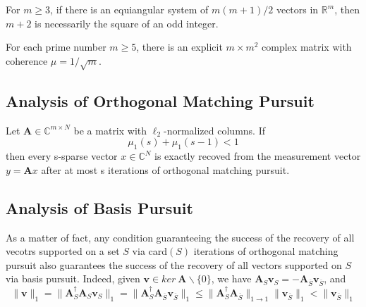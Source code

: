 \begin{theorem}
    \label{1.12}
    For $m \geq 3$, if there is an equiangular system of $m(m+1)/2$ vectors in $\mathbb{R}^m$, then $m+2$ is necessarily the square of an odd integer.
\end{theorem}

\begin{proposition}
    \label{pr1.13}
    For each prime number $m \geq 5$, there is an explicit $m \times m^2$ complex matrix with coherence $\mu = 1/\sqrt{m}$.
\end{proposition}

\subsection{Analysis of Orthogonal Matching Pursuit}
\begin{theorem}
    \label{th1.14}
    Let $\mathbf{A} \in \mathbb{C}^{m \times N}$ be a matrix with $\ell_2$-normalized columns. If 
    \begin{equation}
        \mu_1(s) + \mu_1(s-1) < 1
        \label{eq1.11}
    \end{equation}
    then every s-sparse vector $x \in \mathbb{C}^N$ is exactly recoved from the measurement vector $y = \mathbf{A}x$ after at most s iterations of orthogonal matching pursuit.
\end{theorem}

\subsection{Analysis of Basis Pursuit}
As a matter of fact, any condition guaranteeing the success of the recovery of all vecotrs supported on a set $S$ via card$(S)$ iterations of orthogonal matching pursuit also guarantees the success of the recovery of all vectors supported on $S$ via basis pursuit. Indeed, given $\mathbf{v} \in ker\ \mathbf{A} \backslash \{0\}$, we have $\mathbf{A}_S\mathbf{v}_S = -\mathbf{A}_{\overline{S}} \mathbf{v}_{\overline{S}}$, and 
\[
    \|\mathbf{v}\|_1 = \|\mathbf{A}_S^{\dagger} \mathbf{A}_S \mathbf{v}_S\|_1 = \|\mathbf{A}_S^{\dagger}\mathbf{A}_{\overline{S}}\mathbf{v}_{\overline{S}}\|_1 \leq \|\mathbf{A}_S^{\dagger} \mathbf{A}_{\overline{S}}\|_{1 \rightarrow 1}\|\mathbf{v}_{\overline{S}}\|_1 < \|\mathbf{v}_{\overline{S}}\|_1
\]

